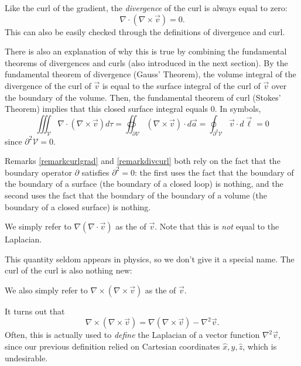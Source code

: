 Like the curl of the gradient, the \textit{divergence} of the curl is always equal to zero:
\[\nabla\cdot(\nabla\times \vec{v})=0.\]
This can also be easily checked through the definitions of divergence and curl.

\begin{remark}\label{remarkdivcurl}
There is also an explanation of why this is true by combining the fundamental theorems of divergences and curls (also introduced in the next section). By the fundamental theorem of divergence (Gauss' Theorem), the volume integral of the divergence of the curl of $\vec{v}$ is equal to the surface integral of the curl of $\vec{v}$ over the boundary of the volume. Then, the fundamental theorem of curl (Stokes' Theorem) implies that this closed surface integral equals 0. In symbols,
\[\iiint_\mathcal{V}\nabla\cdot(\nabla\times \vec{v}) d\tau=\oiint_{\partial\mathcal{V}}(\nabla\times\vec{v})\cdot d\vec{a}=\oint_{\partial^2\mathcal{V}}\vec{v}\cdot d\vec{\ell}=0\]
since $\partial^2\mathcal{V}=0$.
\end{remark}

\begin{remark}
Remarks \ref{remarkcurlgrad} and \ref{remarkdivcurl} both rely on the fact that the boundary operator $\partial$ satisfies $\partial^2=0$: the first uses the fact that the boundary of the boundary of a surface (the boundary of a closed loop) is nothing, and the second uses the fact that the boundary of the boundary of a volume (the boundary of a closed surface) is nothing.
\end{remark}

\begin{definition}
    We simply refer to $\nabla(\nabla\cdot \vec{v})$ as the  of $\vec{v}$. Note that this is \textit{not} equal to the Laplacian.
\end{definition}

This quantity seldom appears in physics, so we don't give it a special name. The curl of the curl is also nothing new:

\begin{definition}
    We also simply refer to $\nabla\times(\nabla \times \vec{v})$ as the  of $\vec{v}$.
\end{definition}

It turns out that
\[\nabla\times(\nabla\times \vec{v})=\nabla(\nabla\times \vec{v})-\nabla^2\vec{v}.\]
Often, this is actually used to \textit{define} the Laplacian of a vector function $\nabla^2\vec{v}$, since our previous definition relied on Cartesian coordinates $\hat{x}, \hat{y}, \hat{z}$, which is undesirable.

